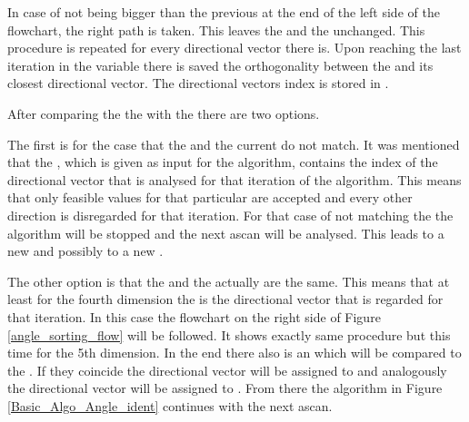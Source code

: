 In case of  not being bigger than the previous  at the end of the left side of the flowchart, the right path is taken. This leaves the  and the  unchanged.
This procedure is repeated for every directional vector there is. Upon reaching the last iteration in the variable   there is saved the orthogonality between the  and its closest directional vector. The directional vectors index is stored in . 

After comparing the the  with the  there are two options. 


The first is for the case that the  and the current  do not match. It was mentioned that the , which is given as input for the algorithm, contains the index of the directional vector that is analysed for that iteration of the algorithm. This means that only feasible values for that particular  are accepted and every other direction is disregarded for that iteration. For that case of  not matching the  the algorithm will be stopped and the next \ac{ascan} will be analysed. This leads to a new  and possibly to a new . 

The other option is that the  and the  actually are the same. This means that at least for the fourth dimension the  is the directional vector that is regarded for that iteration. In this case the flowchart on the right side of Figure \ref{angle_sorting_flow} will be followed. It shows exactly same procedure but this time for the 5th dimension. In the end there also is an  which will be compared to the . If they coincide the directional vector  will be assigned to  and analogously the directional vector  will be assigned to . From there the algorithm in Figure \ref{Basic_Algo_Angle_ident} continues with the next \ac{ascan}. 
















